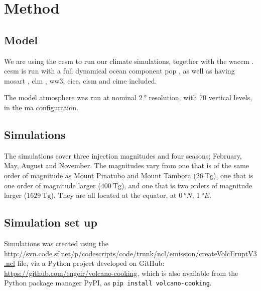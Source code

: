 \documentclass{ametsocV5}
\begin{document}
\section{Method}

\subsection{Model}

We are using the \acrfull{cesm} \citep{danabasoglu2020} to run our climate simulations,
together with the \acrfull{waccm} \citep{gettleman2019}. \acrshort{cesm} is run with a
full dynamical ocean component \acrfull{pop} \citep{smith2010, danabasoglu2020}, as well
as having \acrfull{mosart} \citep{li2013, danabasoglu2020}, \acrfull{clm}
\citep{lawrence2019, danabasoglu2020}, \acrfull{ww3}, \acrfull{cice}, \acrfull{cism} and
\acrfull{cime} included.

The model atmosphere was run at nominal \(\SI{2}{\degree}\) resolution, with \(70\)
vertical levels, in the \acrfull{ma} configuration.

\subsection{Simulations}

The simulations cover three  injection magnitudes and four seasons; February,
May, August and November. The magnitudes vary from one that is of the same order of
magnitude as Mount Pinatubo
\citep[\(\sim10\)--\(\SI{20}{\tera\gram}\);~e.g.,][]{timmreck2018} and Mount Tambora
\citep[\(\sim\SI{56.2}{\tera\gram}\);~e.g.,][]{zanchettin2016}
(\(\SI{26}{\tera\gram}\)), one that is one order of magnitude larger
(\(\SI{400}{\tera\gram}\)), and one that is two orders of magnitude larger
(\(\SI{1629}{\tera\gram}\)). They are all located at the equator, at \(\SI{0}{\degree
  N}\), \(\SI{1}{\degree E}\).

\subsection{Simulation set up}

Simulations was created using the
\url{http://svn.code.sf.net/p/codescripts/code/trunk/ncl/emission/createVolcEruptV3.ncl}
file, via a Python project developed on GitHub:
\url{https://github.com/engeir/volcano-cooking}, which is also available from the Python
package manager PyPI, as \texttt{pip install volcano-cooking}.
\end{document}

